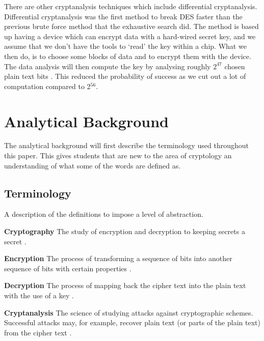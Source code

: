 \documentclass[11pt,a4paper]{report}
\begin{document}
There are other cryptanalysis techniques which include differential cryptanalysis. Differential cryptanalysis was the first method to break DES faster than the previous brute force method that the exhaustive search did. The method is based up having a device which can encrypt data with a hard-wired secret key, and we assume that we don't have the tools to `read' the key within a chip. What we then do, is to choose some blocks of data and to encrypt them with the device. The data analysis will then compute the key by analysing roughly $2^{47}$ chosen plain text bits \cite{Junod2013LASEC}. This reduced  the probability of success as we cut out a lot of computation compared to 2$^{56}$. 


\chapter{Analytical Background}
\label{cha:AnBack}
The analytical background will first describe the terminology used throughout this paper. This gives students that are new to the area of cryptology an understanding of what some of the words are defined as.

\section{Terminology}
\label{sec:Term}
A description of the definitions to impose a level of abstraction. \newline

\textbf{Cryptography}\newline
The study of encryption and decryption to keeping secrets a secret \cite{DBLP:series/isc/DelfsK07}.\newline

\textbf{Encryption}\newline
The process of transforming a sequence of bits into another sequence of bits with certain properties \cite{Fabio2000LogicalSAT}.\newline
 
\textbf{ Decryption} \newline
The process of mapping back the cipher text into the plain text with the use of a key \cite{Fabio2000LogicalSAT}. \newline

\textbf{Cryptanalysis}\newline
The science of studying attacks against cryptographic schemes. Successful attacks may, for example, recover plain text (or parts of the plain text) from the cipher text \cite{DBLP:books/sp/Buchmann02}. \newline
\end{document}
